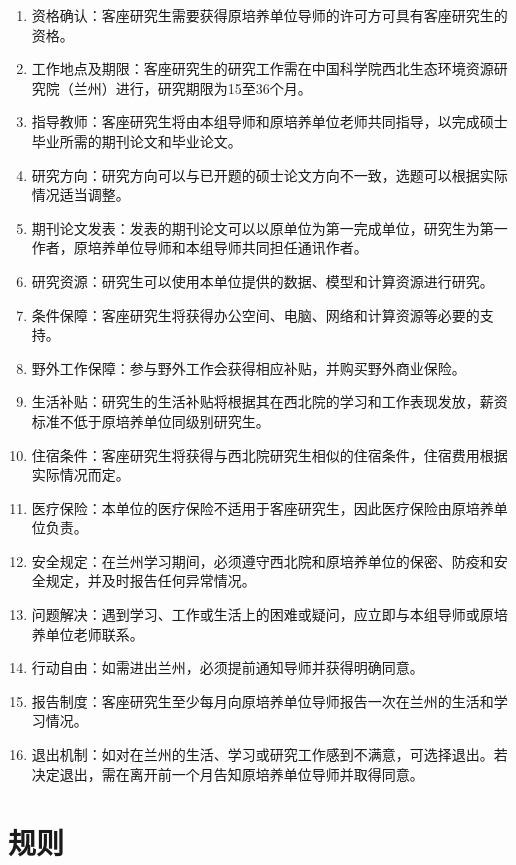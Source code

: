 \documentclass[
]{ctexbook}
\providecommand{\tightlist}{%
  \setlength{\itemsep}{0pt}\setlength{\parskip}{0pt}}
\begin{document}
\begin{enumerate}
\def\labelenumi{\arabic{enumi}.}
\tightlist
\item
  资格确认：客座研究生需要获得原培养单位导师的许可方可具有客座研究生的资格。
\item
  工作地点及期限：客座研究生的研究工作需在中国科学院西北生态环境资源研究院（兰州）进行，研究期限为15至36个月。
\item
  指导教师：客座研究生将由本组导师和原培养单位老师共同指导，以完成硕士毕业所需的期刊论文和毕业论文。
\item
  研究方向：研究方向可以与已开题的硕士论文方向不一致，选题可以根据实际情况适当调整。
\item
  期刊论文发表：发表的期刊论文可以以原单位为第一完成单位，研究生为第一作者，原培养单位导师和本组导师共同担任通讯作者。
\item
  研究资源：研究生可以使用本单位提供的数据、模型和计算资源进行研究。
\item
  条件保障：客座研究生将获得办公空间、电脑、网络和计算资源等必要的支持。
\item
  野外工作保障：参与野外工作会获得相应补贴，并购买野外商业保险。
\item
  生活补贴：研究生的生活补贴将根据其在西北院的学习和工作表现发放，薪资标准不低于原培养单位同级别研究生。
\item
  住宿条件：客座研究生将获得与西北院研究生相似的住宿条件，住宿费用根据实际情况而定。
\item
  医疗保险：本单位的医疗保险不适用于客座研究生，因此医疗保险由原培养单位负责。
\item
  安全规定：在兰州学习期间，必须遵守西北院和原培养单位的保密、防疫和安全规定，并及时报告任何异常情况。
\item
  问题解决：遇到学习、工作或生活上的困难或疑问，应立即与本组导师或原培养单位老师联系。
\item
  行动自由：如需进出兰州，必须提前通知导师并获得明确同意。
\item
  报告制度：客座研究生至少每月向原培养单位导师报告一次在兰州的生活和学习情况。
\item
  退出机制：如对在兰州的生活、学习或研究工作感到不满意，可选择退出。若决定退出，需在离开前一个月告知原培养单位导师并取得同意。
\end{enumerate}

\hypertarget{rules}{%
\chapter{规则}\label{rules}}
\end{document}
